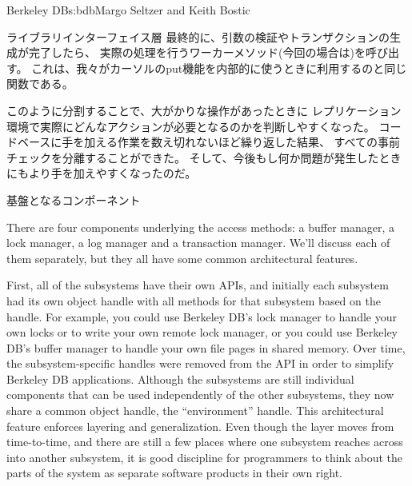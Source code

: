 \begin{aosachapter}{Berkeley DB}{s:bdb}{Margo Seltzer and Keith Bostic}
\begin{aosasect1}{ライブラリインターフェイス層}
最終的に、引数の検証やトランザクションの生成が完了したら、
実際の処理を行うワーカーメソッド(今回の場合は)を呼び出す。
これは、我々がカーソルのput機能を内部的に使うときに利用するのと同じ関数である。

このように分割することで、大がかりな操作があったときに
レプリケーション環境で実際にどんなアクションが必要となるのかを判断しやすくなった。
コードベースに手を加える作業を数え切れないほど繰り返した結果、
すべての事前チェックを分離することができた。
そして、今後もし何か問題が発生したときにもより手を加えやすくなったのだ。

\end{aosasect1}

\begin{aosasect1}{基盤となるコンポーネント}

There are four components underlying the access methods: a buffer
manager, a lock manager, a log manager and a transaction
manager. We'll discuss each of them separately, but they all have some
common architectural features.

First, all of the subsystems have their own APIs, and initially each
subsystem had its own object handle with all methods for that
subsystem based on the handle. For example, you could use Berkeley
DB's lock manager to handle your own locks or to write your own remote
lock manager, or you could use Berkeley DB's buffer manager to handle
your own file pages in shared memory. Over time, the
subsystem-specific handles were removed from the API in order to
simplify Berkeley DB applications. Although the subsystems are still
individual components that can be used independently of the other
subsystems, they now share a common object handle, the 
``environment'' handle. This architectural feature enforces layering
and generalization. Even though the layer moves from time-to-time, and
there are still a few places where one subsystem reaches across into
another subsystem, it is good discipline for programmers to think about
the parts of the system as separate software products in their own right.


\end{aosasect1}
\end{aosachapter}
